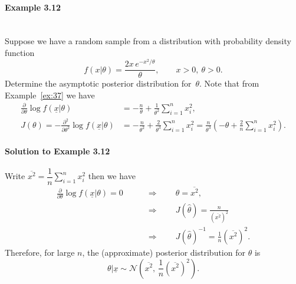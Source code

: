 \paragraph{Example 3.12}{~\\
Suppose we have a random sample from a distribution with probability density function
\begin{equation*}
f(x|\theta)=\frac{2x\,e^{-x^2/\theta}}{\theta},\quad\quad x>0,~\theta>0.
\end{equation*}
Determine the asymptotic posterior distribution for~$\theta$. Note that from Example~\ref{ex:37} we have 
\begin{align*}
\frac{\partial}{\partial\theta} \log
f(\underline{x}|\theta)&=-\frac{n}{\theta}+\frac{1}{\theta^2}\sum_{i=1}^n
x_i^2, \\
J(\theta)=-\frac{\partial^2}{\partial\theta^2} \log
f(\underline{x}|\theta)&=-\frac{n}{\theta^2} +\frac{2}{\theta^3}\sum_{i=1}^n
x_i^2 =\frac{n}{\theta^3}\left(-\theta+\frac{2}{n}\sum_{i=1}^n
x_i^2\right).
\end{align*}

\paragraph{Solution to Example 3.12}{
    
    Write $\overline{x^2}=\dfrac{1}{n}\displaystyle\sum_{i=1}^n x_i^2$ then we have
    \begin{align*}
    \frac{\partial}{\partial\theta} \log f(\underline{x}|\theta)=0
    \quad\quad&\Longrightarrow\quad\quad
    \hat\theta=\overline{x^2}, \\
    &\Longrightarrow\quad\quad
    J(\hat\theta)=\frac{n}{\left(\overline{x^2}\right)^2} \\
    &\Longrightarrow\quad\quad
    J(\hat\theta)^{-1}=\frac{1}{n}\left(\overline{x^2}\right)^2.
    \end{align*}
    Therefore, for large $n$, the (approximate) posterior distribution for
    $\theta$ is
    $$
    \theta|\underline{x}\sim \mathcal{N}\left(\overline{x^2},\,
    \frac{1}{n}\left(\overline{x^2}\right)^2\right).
    $$
    
    
}}

\newpage

